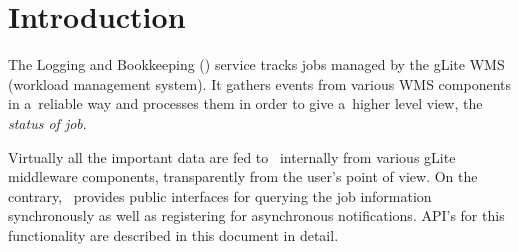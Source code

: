 \section{Introduction}

The Logging and Bookkeeping (\LB) service tracks jobs managed by 
the gLite WMS (workload management system).
It gathers events from various WMS components in a~reliable way
and processes them in order to give a~higher level view, the
\emph{status of job}.

Virtually all the important
data are fed to \LB\ internally from various gLite middleware
components, transparently from the user's point of view.
On the contrary, \LB\ provides public interfaces for querying the job
information synchronously as well as registering for asynchronous
notifications.
API's for this functionality are described in this document in detail.

\endinput
